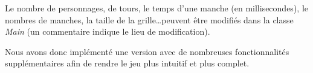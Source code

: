 Le nombre de personnages, de tours, le temps d'une manche (en millisecondes), le nombres de manches, la taille de la grille\dots peuvent être modifiés dans la classe \textit{Main} (un commentaire indique le lieu de modification).
\bigskip

Nous avons donc implémenté une version avec de nombreuses fonctionnalités supplémentaires afin de rendre le jeu plus intuitif et plus complet.